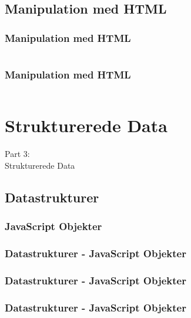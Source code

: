 \subsection{Manipulation med HTML}
\begin{frame}
    \frametitle{Manipulation med HTML}
    \vspace{-1mm}
    \inputminted[highlightlines={},breaklines=true]{javascript}{../src/frontend/part2_html/logic.js}
\end{frame}
\begin{frame}
    \frametitle{Manipulation med HTML}
    \vspace{-1mm}
    \inputminted[highlightlines={1,9,11,13},breaklines=true]{javascript}{../src/frontend/part2_html/logic.js}
\end{frame}

\section{Strukturerede Data}
\begin{frame}
    \vspace{25mm}
    \begin{center}
        \Huge{Part 3:\\Strukturerede Data}
    \end{center}
\end{frame}

\subsection{Datastrukturer}
\subsubsection{JavaScript Objekter}

\begin{frame}
    \frametitle{Datastrukturer - JavaScript Objekter}
    \vspace{-1mm}
    \begin{center}
    \end{center}
\end{frame}
\begin{frame}
    \frametitle{Datastrukturer - JavaScript Objekter}
    \vspace{-1mm}
    \begin{center}
    \end{center}
\end{frame}
\begin{frame}
    \frametitle{Datastrukturer - JavaScript Objekter}
    \vspace{-1mm}
    \begin{center}
    \end{center}
\end{frame}

